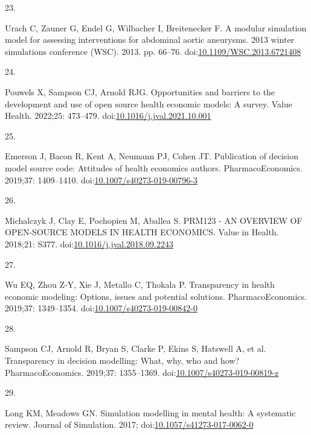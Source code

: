 \documentclass[
]{article}
\newlength{\cslhangindent}
\newlength{\csllabelwidth}
\newlength{\cslentryspacingunit} %
\newenvironment{CSLReferences}[2] %
 {%
  \setlength{\parindent}{0pt}
  \ifodd #1
  \let\oldpar\par
  \def\par{\hangindent=\cslhangindent\oldpar}
  \fi
  \setlength{\parskip}{#2\cslentryspacingunit}
 }%
 {}
\newcommand{\CSLLeftMargin}[1]{\parbox[t]{\csllabelwidth}{#1}}
\newcommand{\CSLRightInline}[1]{\parbox[t]{\linewidth - \csllabelwidth}{#1}\break}
\begin{document}
\begin{CSLReferences}{0}{0}
\leavevmode{}%
\CSLLeftMargin{23. }%
\CSLRightInline{Urach C, Zauner G, Endel G, Wilbacher I, Breitenecker F. A modular simulation model for assessing interventions for abdominal aortic aneurysms. 2013 winter simulations conference (WSC). 2013. pp. 66--76. doi:\href{https://doi.org/10.1109/WSC.2013.6721408}{10.1109/WSC.2013.6721408}}

\leavevmode{}%
\CSLLeftMargin{24. }%
\CSLRightInline{Pouwels X, Sampson CJ, Arnold RJG. Opportunities and barriers to the development and use of open source health economic models: A survey. Value Health. 2022;25: 473--479. doi:\href{https://doi.org/10.1016/j.jval.2021.10.001}{10.1016/j.jval.2021.10.001}}

\leavevmode{}%
\CSLLeftMargin{25. }%
\CSLRightInline{Emerson J, Bacon R, Kent A, Neumann PJ, Cohen JT. Publication of decision model source code: Attitudes of health economics authors. PharmacoEconomics. 2019;37: 1409--1410. doi:\href{https://doi.org/10.1007/s40273-019-00796-3}{10.1007/s40273-019-00796-3}}

\leavevmode{}%
\CSLLeftMargin{26. }%
\CSLRightInline{Michalczyk J, Clay E, Pochopien M, Aballea S. PRM123 - AN OVERVIEW OF OPEN-SOURCE MODELS IN HEALTH ECONOMICS. Value in Health. 2018;21: S377. doi:\href{https://doi.org/10.1016/j.jval.2018.09.2243}{10.1016/j.jval.2018.09.2243}}

\leavevmode{}%
\CSLLeftMargin{27. }%
\CSLRightInline{Wu EQ, Zhou Z-Y, Xie J, Metallo C, Thokala P. Transparency in health economic modeling: Options, issues and potential solutions. PharmacoEconomics. 2019;37: 1349--1354. doi:\href{https://doi.org/10.1007/s40273-019-00842-0}{10.1007/s40273-019-00842-0}}

\leavevmode{}%
\CSLLeftMargin{28. }%
\CSLRightInline{Sampson CJ, Arnold R, Bryan S, Clarke P, Ekins S, Hatswell A, et al. Transparency in decision modelling: What, why, who and how? PharmacoEconomics. 2019;37: 1355--1369. doi:\href{https://doi.org/10.1007/s40273-019-00819-z}{10.1007/s40273-019-00819-z}}

\leavevmode{}%
\CSLLeftMargin{29. }%
\CSLRightInline{Long KM, Meadows GN. Simulation modelling in mental health: A systematic review. Journal of Simulation. 2017; doi:\href{https://doi.org/10.1057/s41273-017-0062-0}{10.1057/s41273-017-0062-0}}


\end{CSLReferences}
\end{document}
